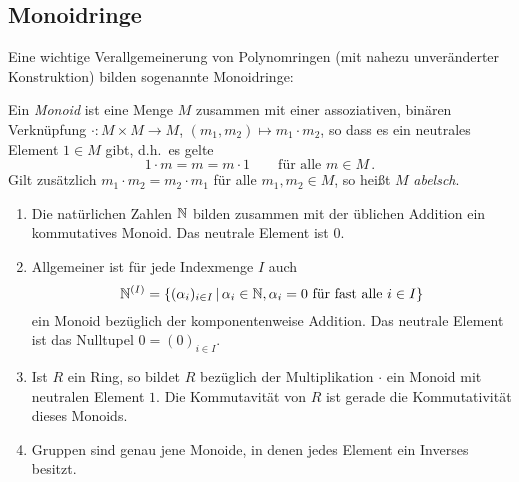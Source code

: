 \subsection*{Monoidringe}

Eine wichtige Verallgemeinerung von Polynomringen (mit nahezu unveränderter Konstruktion) bilden sogenannte Monoidringe:

\begin{definition}
  Ein \emph{Monoid} ist eine Menge $M$ zusammen mit einer assoziativen, binären Verknüpfung $\cdot \colon M \times M \to M$, $(m_1, m_2) \mapsto m_1 \cdot m_2$, so dass es ein neutrales Element $1 \in M$ gibt, d.h.\ es gelte
  \[
      1 \cdot m
    = m
    = m \cdot 1
    \qquad
    \text{für alle $m \in M$} \,.
  \]
  Gilt zusätzlich $m_1 \cdot m_2 = m_2 \cdot m_1$ für alle $m_1, m_2 \in M$, so heißt $M$ \emph{abelsch}.
\end{definition}

\begin{example}
  \leavevmode
  \begin{enumerate}
    \item
      Die natürlichen Zahlen $\mathbb{N}$ bilden zusammen mit der üblichen Addition ein kommutatives Monoid.
      Das neutrale Element ist $0$.
    \item
      Allgemeiner ist für jede Indexmenge $I$ auch
      \[
          \Natural^{(I)}
        = \{
            (\alpha_i)_{i \in I}
          \suchthat
            \alpha_i \in \Natural,
            \text{$\alpha_i = 0$ für fast alle $i \in I$}
          \}
      \]
      ein Monoid bezüglich der komponentenweise Addition.
      Das neutrale Element ist das Nulltupel $0 = (0)_{i \in I}$.
    \item
      Ist $R$ ein Ring, so bildet $R$ bezüglich der Multiplikation $\cdot$ ein Monoid mit neutralen Element $1$.
      Die Kommutavität von $R$ ist gerade die Kommutativität dieses Monoids.
    \item
      Gruppen sind genau jene Monoide, in denen jedes Element ein Inverses besitzt.
  \end{enumerate}
\end{example}

